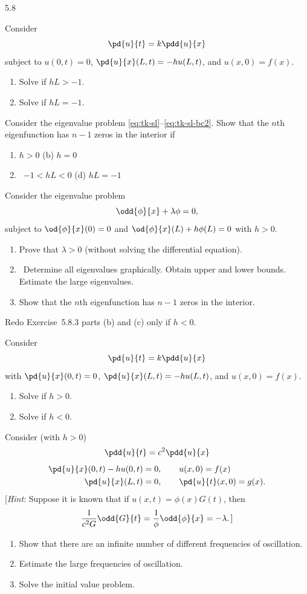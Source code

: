 \begin{exercises}{5.8}

\item Consider
\[
\pd{u}{t} = k\pdd{u}{x}
\]
subject to $u(0,t) = 0$, $\pd{u}{x}(L,t) = -hu(L,t)$, and $u(x,0) = f(x)$.
\begin{enumerate}
\item Solve if $hL > -1$.
\item Solve if $hL = -1$.
\end{enumerate}

\item Consider the eigenvalue problem \eqref{eq:tk-sl}--\eqref{eq:tk-sl-bc2}.  Show that the $n$th eigenfunction has $n-1$ zeros in the interior if
\begin{enumerate}
\item $h > 0$ \qquad\qquad (b) $h = 0$
\item\starred\ $-1 < hL < 0$ \qquad (d) $hL = -1$
\end{enumerate}

\item Consider the eigenvalue problem
\[
\odd{\phi}{x} + \lambda\phi = 0,
\]
subject to $\od{\phi}{x}(0) = 0$ and $\od{\phi}{x}(L) + h\phi(L) = 0$ with $h > 0$.
\begin{enumerate}
\item Prove that $\lambda > 0$ (without solving the differential equation).
\item\starred\ Determine all eigenvalues graphically.  Obtain upper and lower bounds.  Estimate the large eigenvalues.
\item Show that the $n$th eigenfunction has $n - 1$ zeros in the interior.
\end{enumerate}

\item Redo Exercise~5.8.3 parts (b) and (c) only if $h < 0$.

\item Consider
\[
\pd{u}{t} = k\pdd{u}{x}
\]
with $\pd{u}{x}(0,t) = 0$, $\pd{u}{x}(L,t) = -hu(L,t)$, and $u(x,0) = f(x)$.
\begin{enumerate}
\item Solve if $h > 0$.
\item Solve if $h < 0$.
\end{enumerate}

\item Consider (with $h > 0$)
\[
\pdd{u}{t} = c^2\pdd{u}{x}
\]
\begin{align*}
\pd{u}{x}(0,t) - hu(0,t) &= 0, \qquad u(x,0) = f(x) \\
\pd{u}{x}(L,t) &= 0, \qquad \pd{u}{t}(x,0) = g(x).
\end{align*}
[\textit{Hint}: Suppose it is known that if $u(x,t) = \phi(x)G(t)$, then
\[
\frac{1}{c^2G}\odd{G}{t} = \frac{1}{\phi}\odd{\phi}{x} = -\lambda.\,]
\]
\begin{enumerate}
\item Show that there are an infinite number of different frequencies of oscillation.
\item Estimate the large frequencies of oscillation.
\item Solve the initial value problem.
\end{enumerate}


\end{exercises}
